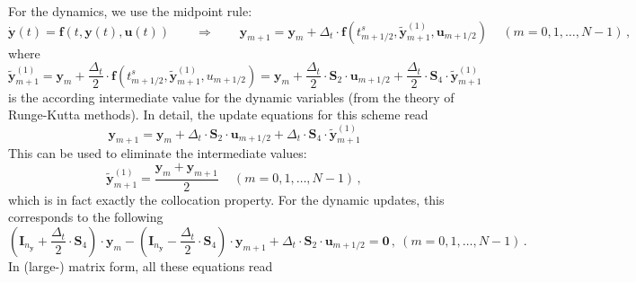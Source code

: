 \documentclass{article}
\newcommand{\vectorfont}[1]{\boldsymbol{#1}}%
\newcommand{\greekvectorfont}[1]{\boldsymbol{#1}}%
\newcommand{\matrixfont}[1]{\mathbf{#1}}%
\newcommand{\fvec}{\vectorfont{f}}
\newcommand{\uvec}{\vectorfont{u}}
\newcommand{\yvec}{\vectorfont{y}}
\newcommand{\tildeyvec}{\vectorfont{\tilde{y}}}
\newcommand{\dyvec}{\vectorfont{\dot{y}}}
\newcommand{\nullvec}{\greekvectorfont{0}}
\newcommand{\Imat}{\matrixfont{I}}%
\newcommand{\Smat}{\matrixfont{S}}
\begin{document}
For the dynamics, we use the midpoint rule:
\[
\dyvec(t) = \fvec(t, \yvec(t), \uvec(t))\qquad\Rightarrow\qquad
\yvec_{m+1} = \yvec_{m} + \Delta_t \cdot \fvec(t_{m+1/2}^s, \tildeyvec_{m+1}^{(1)}, \uvec_{m+1/2})\,\quad (m=0,1,\ldots,N-1)\,,
\]
where 
\[%
\tildeyvec_{m+1}^{(1)} %
= \yvec_m + \frac{\Delta_t}{2} \cdot \fvec (t_{m+1/2}^s , \tildeyvec_{m+1}^{(1)}, u_{m+1/2})
= \yvec_m + \frac{\Delta_t}{2} \cdot \Smat_2 \cdot \uvec_{m+1/2} + \frac{\Delta_t}{2} \cdot \Smat_4 \cdot \tildeyvec_{m+1}^{(1)}
\]%
is the according intermediate value for the dynamic variables (from the theory of Runge-Kutta methods).
In detail, the update equations for this scheme read
\[
\yvec_{m+1} = \yvec_m + \Delta_t \cdot \Smat_2 \cdot \uvec_{m+1/2} + \Delta_t \cdot \Smat_4 \cdot \tildeyvec_{m+1}^{(1)}
\]
This can be used to eliminate the intermediate values:
\[
\tildeyvec_{m+1}^{(1)} = \frac{\yvec_m + \yvec_{m+1}}{2}\,\quad (m=0,1,\ldots, N-1)\,,
\]
which is in fact exactly the collocation property.
%
For the dynamic updates, this corresponds to the following
\[
\left(\Imat_{n_{\yvec}} + \frac{\Delta_t}{2} \cdot \Smat_4 \right) \cdot \yvec_m - \left(\Imat_{n_{\yvec}}- \frac{\Delta_t}{2}\cdot \Smat_4 \right)\cdot\yvec_{m+1} + \Delta_t \cdot \Smat_2 \cdot \uvec_{m+1/2} = \nullvec\,,~(m = 0,1,\ldots,N-1)\,.
\]
In (large-) matrix form, all these equations read
\end{document}

